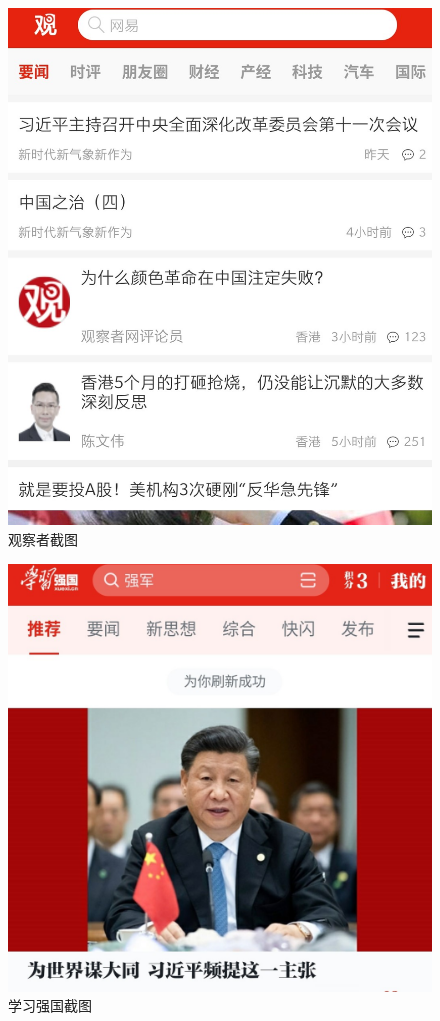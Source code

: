 \documentclass{article}
\begin{document}
\begin{figure}[h!]
	\centering
	\includegraphics[scale=0.2]{Screenshot_20191127-132354}
	\caption{观察者截图}
	\label{fig:ggwqc.jpg}
\end{figure}

\begin{figure}[h!]
	\centering
	\includegraphics[scale=0.2]{Screenshot_20191127-132729}
	\caption{学习强国截图}
	\label{fig:ggwrc.jpg}
\end{figure}
\end{document}
